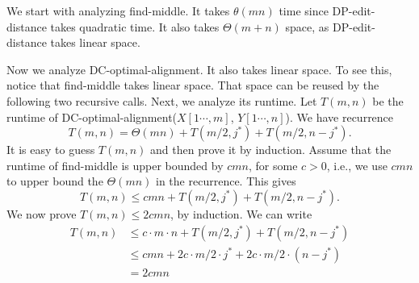 We start with analyzing find-middle.  It takes $\theta(mn)$ time since
DP-edit-distance takes quadratic time.  It also takes $\Theta(m +n)$ space, as
DP-edit-distance takes linear space.

Now we analyze DC-optimal-alignment. It also takes linear space.
To see this, notice that find-middle takes linear space.
That space can be reused by the following two recursive calls.
Next, we analyze its runtime. Let $T(m,n)$ be the runtime of
DC-optimal-alignment($X[1\cdots, m]$, $Y[1\cdots, n]$).
We have recurrence
$$T(m,n) = \Theta(mn) + T(m/2, j^*) + T(m/2, n-j^*).$$
It is easy to guess $T(m,n)$ and then prove it by induction.
Assume that the runtime of find-middle is upper bounded by $cmn$, for some $c > 0$, i.e.,
we use $cmn$ to upper bound the $\Theta(mn)$ in the recurrence.
This gives $$T(m,n) \le cmn + T(m/2, j^*) + T(m/2, n-j^*).$$
We now prove $T(m,n) \le 2cmn$, by induction.
We can write
\begin{align*}
T(m,n) & \le c\cdot m\cdot n + T(m/2, j^*) + T(m/2, n-j^*)\\
& \le cmn + 2c\cdot m/2\cdot j^* + 2c\cdot m/2 \cdot (n-j^*) \\
& = 2cmn
\end{align*}

